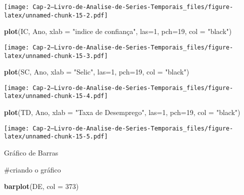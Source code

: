 \documentclass[]{article}
\newenvironment{Shaded}{\begin{snugshade}}{\end{snugshade}}
\newcommand{\DataTypeTok}[1]{\textcolor[rgb]{0.13,0.29,0.53}{#1}}
\newcommand{\DecValTok}[1]{\textcolor[rgb]{0.00,0.00,0.81}{#1}}
\newcommand{\KeywordTok}[1]{\textcolor[rgb]{0.13,0.29,0.53}{\textbf{#1}}}
\newcommand{\NormalTok}[1]{#1}
\newcommand{\StringTok}[1]{\textcolor[rgb]{0.31,0.60,0.02}{#1}}
\begin{document}
\texttt{[image: Cap-2---Livro-de-Analise-de-Series-Temporais\_files/figure-latex/unnamed-chunk-15-2.pdf]}

\begin{Shaded}
\begin{Highlighting}[]
\KeywordTok{plot}\NormalTok{(IC, Ano,}
         \DataTypeTok{xlab =} \StringTok{"indice de confiança"}\NormalTok{, }\DataTypeTok{las=}\DecValTok{1}\NormalTok{, }\DataTypeTok{pch=}\DecValTok{19}\NormalTok{, }\DataTypeTok{col =} \StringTok{"black"}\NormalTok{)}
\end{Highlighting}
\end{Shaded}

\texttt{[image: Cap-2---Livro-de-Analise-de-Series-Temporais\_files/figure-latex/unnamed-chunk-15-3.pdf]}

\begin{Shaded}
\begin{Highlighting}[]
\KeywordTok{plot}\NormalTok{(SC, Ano,}
         \DataTypeTok{xlab =} \StringTok{"Selic"}\NormalTok{, }\DataTypeTok{las=}\DecValTok{1}\NormalTok{, }\DataTypeTok{pch=}\DecValTok{19}\NormalTok{, }\DataTypeTok{col =} \StringTok{"black"}\NormalTok{)}
\end{Highlighting}
\end{Shaded}

\texttt{[image: Cap-2---Livro-de-Analise-de-Series-Temporais\_files/figure-latex/unnamed-chunk-15-4.pdf]}

\begin{Shaded}
\begin{Highlighting}[]
\KeywordTok{plot}\NormalTok{(TD, Ano,}
         \DataTypeTok{xlab =} \StringTok{"Taxa de Desemprego"}\NormalTok{, }\DataTypeTok{las=}\DecValTok{1}\NormalTok{, }\DataTypeTok{pch=}\DecValTok{19}\NormalTok{, }\DataTypeTok{col =} \StringTok{"black"}\NormalTok{)}
\end{Highlighting}
\end{Shaded}

\texttt{[image: Cap-2---Livro-de-Analise-de-Series-Temporais\_files/figure-latex/unnamed-chunk-15-5.pdf]}

Gráfico de Barras

\#criando o gráfico

\begin{Shaded}
\begin{Highlighting}[]
\KeywordTok{barplot}\NormalTok{(DE, }\DataTypeTok{col =} \DecValTok{373}\NormalTok{)}
\end{Highlighting}
\end{Shaded}
\end{document}
